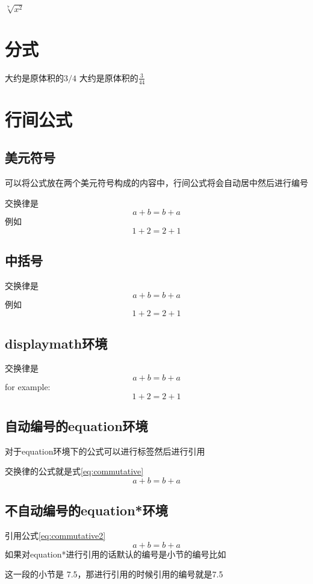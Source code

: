 \documentclass{article}
\begin{document}
    $\sqrt[7]{x^2}$
    \section{分式}
    大约是原体积的$3/4$
    大约是原体积的$\frac{3}{44}$
    \section{行间公式}
    \subsection{美元符号}
    可以将公式放在两个美元符号构成的内容中，行间公式将会自动居中然后进行编号

    交换律是$$a+b=b+a$$例如$$1+2=2+1$$
    \subsection{中括号}
    交换律是\[a+b=b+a\]例如\[1+2=2+1\]
    \subsection{displaymath环境}
    交换律是
    \begin{displaymath}
        a+b=b+a
    \end{displaymath}
    for example:
    \begin{displaymath}
        1+2=2+1
    \end{displaymath}
    \subsection{自动编号的equation环境}
    对于equation环境下的公式可以进行标签然后进行引用

    交换律的公式就是式\ref{eq:commutative}
    \begin{equation}
        \label{eq:commutative}
        a+b=b+a
    \end{equation}
    \subsection{不自动编号的equation*环境}
    引用公式\ref{eq:commutative2}
    \begin{equation*}\label{eq:commutative2}
        a+b=b+a
    \end{equation*}
    如果对equation*进行引用的话默认的编号是小节的编号比如

    这一段的小节是 7.5，那进行引用的时候引用的编号就是7.5
\end{document}

